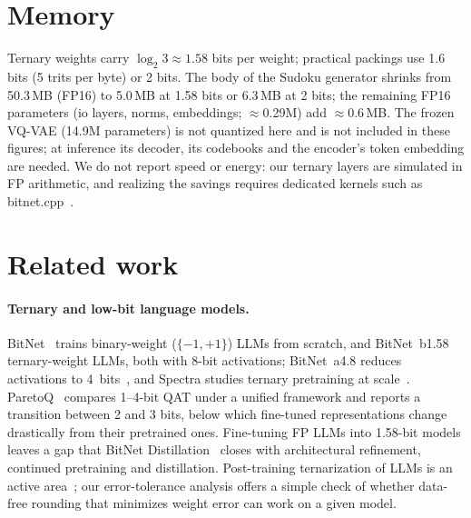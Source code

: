 \documentclass[11pt]{article}
\begin{document}
\section{Memory}
\label{sec:memory}

Ternary weights carry $\log_2 3\approx1.58$ bits per weight; practical packings use 1.6 bits (5 trits per byte)
or 2 bits. The body of the Sudoku generator shrinks from 50.3\,MB (FP16) to 5.0\,MB at 1.58 bits or 6.3\,MB at
2 bits; the remaining FP16 parameters (io layers, norms, embeddings; $\approx$0.29M) add $\approx$0.6\,MB. The
frozen VQ-VAE (14.9M parameters) is not quantized here and is not included in these figures; at inference its
decoder, its codebooks and the encoder's token embedding are needed. We do not report speed or energy: our
ternary layers are simulated in FP arithmetic, and realizing the savings requires dedicated kernels such as
bitnet.cpp~\citep{wang2024bitnetcpp}.

\section{Related work}

\paragraph{Ternary and low-bit language models.}
BitNet~\citep{wang2023bitnet} trains binary-weight ($\{-1,+1\}$) LLMs from scratch, and
BitNet~b1.58~\citep{ma2024era,ma2025bitnet2b4t} ternary-weight LLMs, both with 8-bit activations; BitNet~a4.8
reduces activations to 4~bits~\citep{wang2024bitneta48}, and Spectra studies ternary pretraining at
scale~\citep{kaushal2024spectra}. ParetoQ~\citep{liu2025paretoq} compares 1--4-bit QAT under a unified framework
and reports a transition between 2 and 3 bits, below which fine-tuned representations change drastically from
their pretrained ones. Fine-tuning FP LLMs into 1.58-bit models leaves a gap that BitNet
Distillation~\citep{bitdistill} closes with architectural refinement, continued pretraining and distillation.
Post-training ternarization of LLMs is an active area~\citep{pt2llm}; our error-tolerance analysis offers a simple
check of whether data-free rounding that minimizes weight error can work on a given model.
\end{document}
